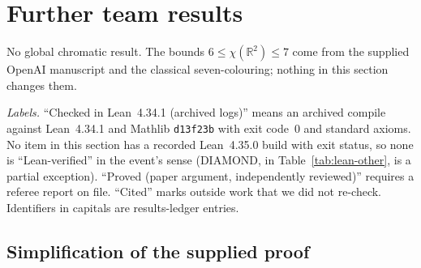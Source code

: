 \documentclass[11pt]{article}
\theoremstyle{definition}
\theoremstyle{remark}
\begin{document}
\section{Further team results}

No global chromatic result.
The bounds $6\le\chi(\mathbb{R}^2)\le 7$ come from the supplied OpenAI
manuscript and the classical seven-colouring; nothing in this section changes
them.

\emph{Labels.} ``Checked in Lean~4.34.1 (archived logs)'' means an archived
compile against Lean~4.34.1 and Mathlib \texttt{d13f23b} with exit code~0 and
standard axioms. No item in this section has a recorded Lean~4.35.0 build with exit status,
so none is ``Lean-verified'' in the event's sense (DIAMOND, in
Table~\ref{tab:lean-other}, is a partial exception). ``Proved (paper argument,
independently reviewed)'' requires a referee report on file. ``Cited'' marks
outside work that we did not re-check. Identifiers in capitals are
results-ledger entries.

\subsection{Simplification of the supplied proof}
\end{document}
